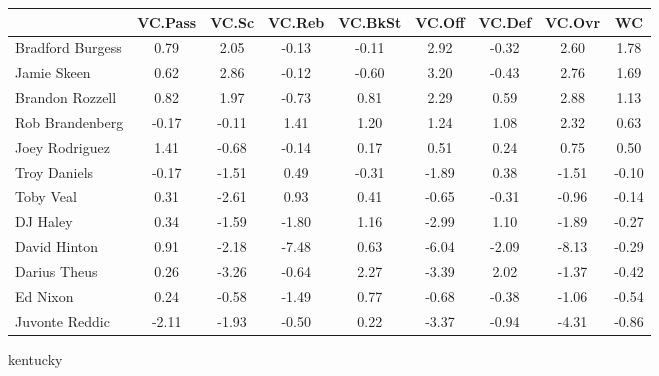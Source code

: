 \documentclass[10pt,letterpaper]{article}
\begin{document}
\begin{table}[ht]
\begin{center}
\begin{tabular}{lcccccccc}
  \hline
 & VC.Pass & VC.Sc & VC.Reb & VC.BkSt & VC.Off & VC.Def & VC.Ovr & WC \\ 
  \hline
Bradford Burgess & 0.79 & 2.05 & -0.13 & -0.11 & 2.92 & -0.32 & 2.60 & 1.78 \\ 
  Jamie Skeen & 0.62 & 2.86 & -0.12 & -0.60 & 3.20 & -0.43 & 2.76 & 1.69 \\ 
  Brandon Rozzell & 0.82 & 1.97 & -0.73 & 0.81 & 2.29 & 0.59 & 2.88 & 1.13 \\ 
  Rob Brandenberg & -0.17 & -0.11 & 1.41 & 1.20 & 1.24 & 1.08 & 2.32 & 0.63 \\ 
  Joey Rodriguez & 1.41 & -0.68 & -0.14 & 0.17 & 0.51 & 0.24 & 0.75 & 0.50 \\ 
  Troy Daniels & -0.17 & -1.51 & 0.49 & -0.31 & -1.89 & 0.38 & -1.51 & -0.10 \\ 
  Toby Veal & 0.31 & -2.61 & 0.93 & 0.41 & -0.65 & -0.31 & -0.96 & -0.14 \\ 
  DJ Haley & 0.34 & -1.59 & -1.80 & 1.16 & -2.99 & 1.10 & -1.89 & -0.27 \\ 
  David Hinton & 0.91 & -2.18 & -7.48 & 0.63 & -6.04 & -2.09 & -8.13 & -0.29 \\ 
  Darius Theus & 0.26 & -3.26 & -0.64 & 2.27 & -3.39 & 2.02 & -1.37 & -0.42 \\ 
  Ed Nixon & 0.24 & -0.58 & -1.49 & 0.77 & -0.68 & -0.38 & -1.06 & -0.54 \\ 
  Juvonte Reddic & -2.11 & -1.93 & -0.50 & 0.22 & -3.37 & -0.94 & -4.31 & -0.86 \\ 
   \hline
\end{tabular}
\end{center}
\end{table}
\newpage
\begin{center}
kentucky 
\end{center}
\end{document}
